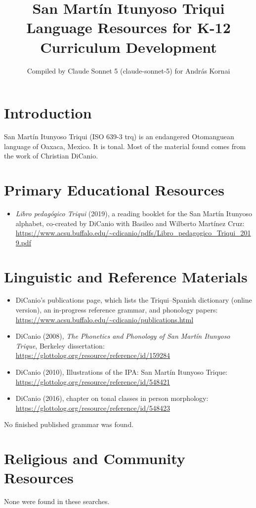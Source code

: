 \documentclass[12pt]{article}
\title{San Mart\'in Itunyoso Triqui Language Resources for K-12 Curriculum Development}
\author{Compiled by Claude Sonnet 5 (claude-sonnet-5) for Andr\'as Kornai}
\date{}
\begin{document}
\maketitle

\section{Introduction}
San Mart\'in Itunyoso Triqui (ISO 639-3 trq) is an endangered Otomanguean language of Oaxaca, Mexico. It is tonal. Most of the material found comes from the work of Christian DiCanio.

\section{Primary Educational Resources}
\begin{itemize}
\item \emph{Libro pedag\'ogico Triqui} (2019), a reading booklet for the San Mart\'in Itunyoso alphabet, co-created by DiCanio with Basileo and Wilberto Mart\'inez Cruz: \url{https://www.acsu.buffalo.edu/~cdicanio/pdfs/Libro_pedagogico_Triqui_2019.pdf}
\end{itemize}

\section{Linguistic and Reference Materials}
\begin{itemize}
\item DiCanio's publications page, which lists the Triqui--Spanish dictionary (online version), an in-progress reference grammar, and phonology papers: \url{https://www.acsu.buffalo.edu/~cdicanio/publications.html}
\item DiCanio (2008), \emph{The Phonetics and Phonology of San Mart\'in Itunyoso Trique}, Berkeley dissertation: \url{https://glottolog.org/resource/reference/id/159284}
\item DiCanio (2010), Illustrations of the IPA: San Mart\'in Itunyoso Trique: \url{https://glottolog.org/resource/reference/id/548421}
\item DiCanio (2016), chapter on tonal classes in person morphology: \url{https://glottolog.org/resource/reference/id/548423}
\end{itemize}
No finished published grammar was found.

\section{Religious and Community Resources}
None were found in these searches.
\end{document}
